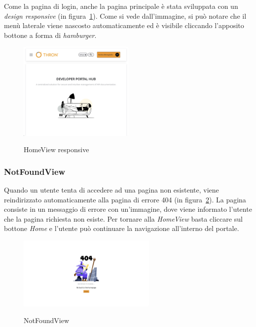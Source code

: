 Come la pagina di login, anche la pagina principale è stata sviluppata con un \textit{design responsive} (in figura~\ref{fig:home-view-responsive}).
Come si vede dall'immagine, si può notare che il menù laterale viene nascosto automaticamente ed è visibile cliccando l'apposito bottone a forma di \textit{hamburger}.

\begin{figure}[ht]
  \centering
  \includegraphics[width=0.5\textwidth, alt={Pagina principale responsive dell'applicazione}]{images/frontend/HomeViewRes.jpg}
  \caption{HomeView responsive}\label{fig:home-view-responsive}
\end{figure}
\pagebreak

\subsubsection{NotFoundView}\label{subsubsec:not-found-view}
Quando un utente tenta di accedere ad una pagina non esistente, viene reindirizzato automaticamente alla pagina di errore 404 (in figura~\ref{fig:not-found-view}).
La pagina consiste in un messaggio di errore con un'immagine, dove viene informato l'utente che la pagina richiesta non esiste.
Per tornare alla \textit{HomeView} basta cliccare sul bottone \textit{Home} e l'utente può continuare la navigazione all'interno del portale.

\begin{figure}[ht]
  \centering
  \includegraphics[width=0.6\textwidth, alt={Pagina di errore 404}]{images/frontend/NotFoundView.jpg}
  \caption{NotFoundView}\label{fig:not-found-view}
\end{figure}
\pagebreak

